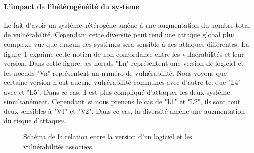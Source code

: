 \paragraph{L'impact de l'hétérogénéité du système}
Le fait d'avoir un système hétérogène amène à une augmentation du nombre total de vulnérabilité.
Cependant cette diversité peut rend une attaque global plus complexe vue que chacun des systèmes sera sensible à des attaques différentes.
La figure~\ref{fig:heteImpactVuln} exprime cette notion de non concordance entre les vulnérabilités et leur version.
Dans cette figure, les nœuds "Ln" représentent une version de logiciel et les noeuds "Vn" représentent un numéro de vulnérabilité.
Nous voyons que certaine version n'ont aucune vulnérabilité communes avec d'autre tel que "L4" avec et "L5".
Dans ce cas, il est plus compliqué d'attaquer les deux système simultanément.
Cependant, si nous prenons le cas de "L1" et "L2", ils sont tout deux sensibles à "V1" et "V2".
Dans ce cas, la diversité amène une augmentation du risque d'attaques.


\begin{figure}
\centering
\caption{Schéma de la relation entre la version d'un logiciel et les vulnérabilités associées.}
\label{fig:heteImpactVuln}
\end{figure}

